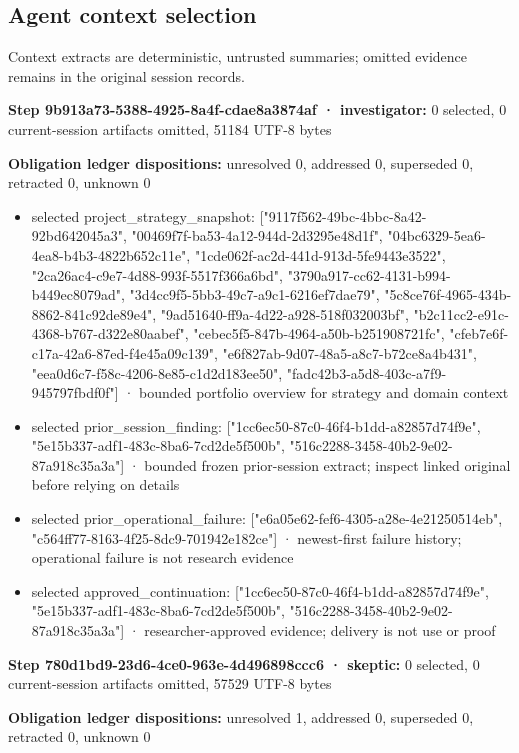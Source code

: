 \documentclass[11pt]{article}
\begin{document}
\subsection{Agent context selection}
Context extracts are deterministic, untrusted summaries; omitted evidence remains in the original session records.\par
\textbf{Step 9b913a73-5388-4925-8a4f-cdae8a3874af · investigator:} 0 selected, 0 current-session artifacts omitted, 51184 UTF-8 bytes\par
\textbf{Obligation ledger dispositions:} unresolved 0, addressed 0, superseded 0, retracted 0, unknown 0\par
\begin{itemize}
\item selected project\_strategy\_snapshot: ["9117f562-49bc-4bbc-8a42-92bd642045a3", "00469f7f-ba53-4a12-944d-2d3295e48d1f", "04bc6329-5ea6-4ea8-b4b3-4822b652c11e", "1cde062f-ac2d-441d-913d-5fe9443e3522", "2ca26ac4-c9e7-4d88-993f-5517f366a6bd", "3790a917-cc62-4131-b994-b449ec8079ad", "3d4cc9f5-5bb3-49c7-a9c1-6216ef7dae79", "5c8ce76f-4965-434b-8862-841c92de89e4", "9ad51640-ff9a-4d22-a928-518f032003bf", "b2c11cc2-e91c-4368-b767-d322e80aabef", "cebec5f5-847b-4964-a50b-b251908721fc", "cfeb7e6f-c17a-42a6-87ed-f4e45a09c139", "e6f827ab-9d07-48a5-a8c7-b72ce8a4b431", "eea0d6c7-f58c-4206-8e85-c1d2d183ee50", "fadc42b3-a5d8-403c-a7f9-945797fbdf0f"] · bounded portfolio overview for strategy and domain context
\item selected prior\_session\_finding: ["1cc6ec50-87c0-46f4-b1dd-a82857d74f9e", "5e15b337-adf1-483c-8ba6-7cd2de5f500b", "516c2288-3458-40b2-9e02-87a918c35a3a"] · bounded frozen prior-session extract; inspect linked original before relying on details
\item selected prior\_operational\_failure: ["e6a05e62-fef6-4305-a28e-4e21250514eb", "c564ff77-8163-4f25-8dc9-701942e182ce"] · newest-first failure history; operational failure is not research evidence
\item selected approved\_continuation: ["1cc6ec50-87c0-46f4-b1dd-a82857d74f9e", "5e15b337-adf1-483c-8ba6-7cd2de5f500b", "516c2288-3458-40b2-9e02-87a918c35a3a"] · researcher-approved evidence; delivery is not use or proof
\end{itemize}
\textbf{Step 780d1bd9-23d6-4ce0-963e-4d496898ccc6 · skeptic:} 0 selected, 0 current-session artifacts omitted, 57529 UTF-8 bytes\par
\textbf{Obligation ledger dispositions:} unresolved 1, addressed 0, superseded 0, retracted 0, unknown 0\par
\end{document}
